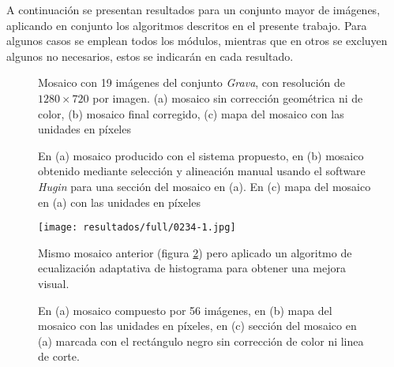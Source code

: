 A continuación se presentan resultados para un conjunto mayor de imágenes, aplicando en conjunto los algoritmos descritos en el presente trabajo. Para algunos casos se emplean todos los módulos, mientras que en otros se excluyen algunos no necesarios, estos se indicarán en cada resultado.

\begin{figure}[h]
	\centering     %
		
	\caption[Mosaico del conjunto \textit{Grava}]{Mosaico con 19 imágenes del conjunto \textit{Grava}, con resolución de $1280\times 720$ por imagen. (a) mosaico sin corrección geométrica ni de color, (b) mosaico final corregido, (c) mapa del mosaico con las unidades en píxeles}
	\label{imagen:full:geo2}
\end{figure}

\begin{figure}[h]
	\centering     %
	
	\caption[Mosaico del conjunto \textit{Chuspa}]{En (a) mosaico producido con el sistema propuesto, en (b) mosaico obtenido mediante selección y alineación manual usando el software \textit{Hugin} para una sección del mosaico en (a). En (c) mapa del mosaico en (a) con las unidades en píxeles}
	\label{imagen:full:0234-map}
\end{figure}

\begin{figure}[h]
	\centering
	\texttt{[image: resultados/full/0234-1.jpg]}
	\caption[Mosaico mejorado visualmente del conjunto \textit{Chuspa}]{Mismo mosaico anterior (figura \ref{imagen:full:0234-map}) pero aplicado un algoritmo de ecualización adaptativa de histograma para obtener una mejora visual.}
	\label{imagen:full:0234-1}
\end{figure}

\begin{figure}[h]
	\centering     %
	
	\caption[Mosaico del conjunto \textit{ScottReef 25}]{En (a) mosaico compuesto por 56 imágenes, en (b) mapa del mosaico con las unidades en píxeles, en (c) sección del mosaico en (a) marcada con el rectángulo negro sin corrección de color ni linea de corte.}
	\label{imagen:full:SR}
\end{figure}


